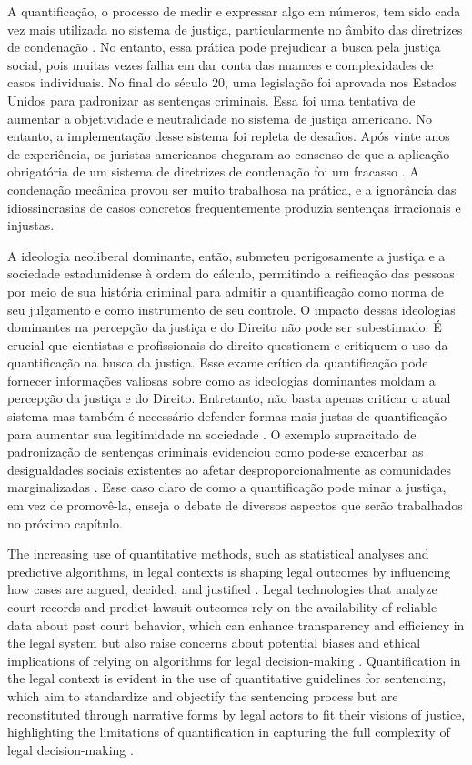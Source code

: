 A quantificação, o processo de medir e expressar algo em números, tem sido cada vez mais utilizada no sistema de justiça, particularmente no âmbito das diretrizes de condenação \cite{salais2016quantification}. No entanto, essa prática pode prejudicar a busca pela justiça social, pois muitas vezes falha em dar conta das nuances e complexidades de casos individuais. No final do século 20, uma legislação foi aprovada nos Estados Unidos para padronizar as sentenças criminais. Essa foi uma tentativa de aumentar a objetividade e neutralidade no sistema de justiça americano. No entanto, a implementação desse sistema foi repleta de desafios. Após vinte anos de experiência, os juristas americanos chegaram ao consenso de que a aplicação obrigatória de um sistema de diretrizes de condenação foi um fracasso \cite{espeland2008sociology}. A condenação mecânica provou ser muito trabalhosa na prática, e a ignorância das idiossincrasias de casos concretos frequentemente produzia sentenças irracionais e injustas.

A ideologia neoliberal dominante, então, submeteu perigosamente a justiça e a sociedade estadunidense à ordem do cálculo, permitindo a reificação das pessoas por meio de sua história criminal para admitir a quantificação como norma de seu julgamento e como instrumento de seu controle. O impacto dessas ideologias dominantes na percepção da justiça e do Direito não pode ser subestimado. É crucial que cientistas e profissionais do direito questionem e critiquem o uso da quantificação na busca da justiça. Esse exame crítico da quantificação pode fornecer informações valiosas sobre como as ideologias dominantes moldam a percepção da justiça e do Direito. Entretanto, não basta apenas criticar o atual sistema mas também é necessário defender formas mais justas de quantificação para aumentar sua legitimidade na sociedade \cite{camargo2022estado}. O exemplo supracitado de padronização de sentenças criminais evidenciou como pode-se exacerbar as desigualdades sociais existentes ao afetar desproporcionalmente as comunidades marginalizadas \cite{lynch2019narrative}. Esse caso claro de como a quantificação pode minar a justiça, em vez de promovê-la, enseja o debate de diversos aspectos que serão trabalhados no próximo capítulo.

The increasing use of quantitative methods, such as statistical analyses and predictive algorithms, in legal contexts is shaping legal outcomes by influencing how cases are argued, decided, and justified \cite{101017s0003975609000150,ribeiro2021quantification,silva2023role}. Legal technologies that analyze court records and predict lawsuit outcomes rely on the availability of reliable data about past court behavior, which can enhance transparency and efficiency in the legal system but also raise concerns about potential biases and ethical implications of relying on algorithms for legal decision-making \cite{silva2023role}. Quantification in the legal context is evident in the use of quantitative guidelines for sentencing, which aim to standardize and objectify the sentencing process but are reconstituted through narrative forms by legal actors to fit their visions of justice, highlighting the limitations of quantification in capturing the full complexity of legal decision-making \cite{101111lsi12334}.

